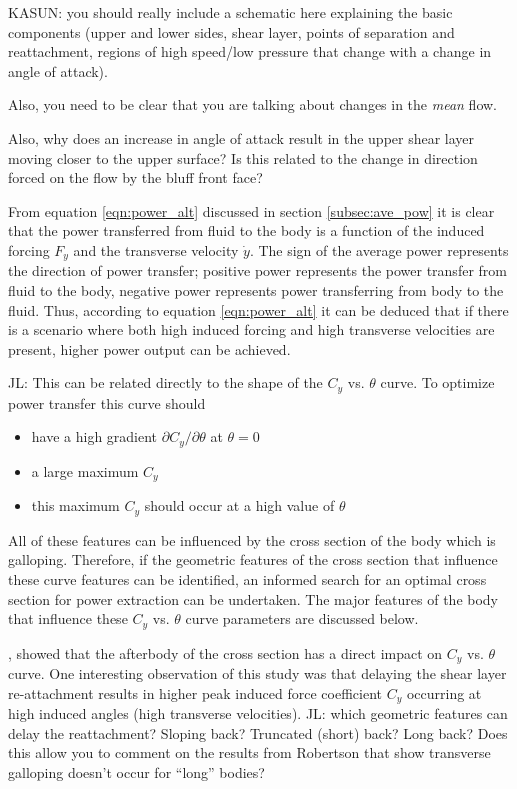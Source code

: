 KASUN: you should really include a schematic here explaining the basic
components (upper and lower sides, shear layer, points of separation
and reattachment, regions of high speed/low pressure that change with
a change in angle of attack).

Also, you need to be clear that you are talking about changes in the
\emph{mean} flow.

Also, why does an increase in angle of attack result in the upper
shear layer moving closer to the upper surface? Is this related to the
change in direction forced on the flow by the bluff front face?

From equation \ref{eqn:power_alt} discussed in section \ref{subsec:ave_pow} it is clear that the power transferred from fluid to the body is a function of the induced forcing $F_y$ and the transverse velocity $\dot{y}$. The sign of the average power represents the direction of power transfer; positive power represents the power transfer from fluid to the body, negative power represents power transferring from body to the fluid. Thus, according to equation \ref{eqn:power_alt} it can be deduced that if there is a scenario where both high induced forcing and high transverse velocities are present, higher power output can be achieved.

JL: This can be related directly to the shape of the $C_y$
vs. $\theta$ curve. To optimize power
transfer this curve should
\begin{itemize}
\item have a high gradient $\partial C_y/\partial \theta$ at
  $\theta = 0$
\item a large maximum $C_y$
\item this maximum $C_y$ should occur at a high value of $\theta$
\end{itemize}
All of these features can be influenced by the cross section of the
body which is galloping. Therefore, if the geometric features of the
cross section that influence these curve features can be identified,
an informed search for an optimal cross section for power extraction
can be undertaken. The major features of the body that influence these
$C_y$ vs. $\theta$ curve parameters are discussed below.

\citet{Luo1994}, showed that the afterbody of the cross section has a direct impact on $C_y$ vs. $\theta$ curve. One interesting observation of this study was that delaying the shear layer re-attachment results in higher peak induced force coefficient $C_y$ occurring at high induced angles (high transverse velocities). JL: which geometric features can delay the reattachment? Sloping back? Truncated (short) back? Long back? Does this allow you to comment on the results from Robertson that show transverse galloping doesn't occur for ``long'' bodies?

